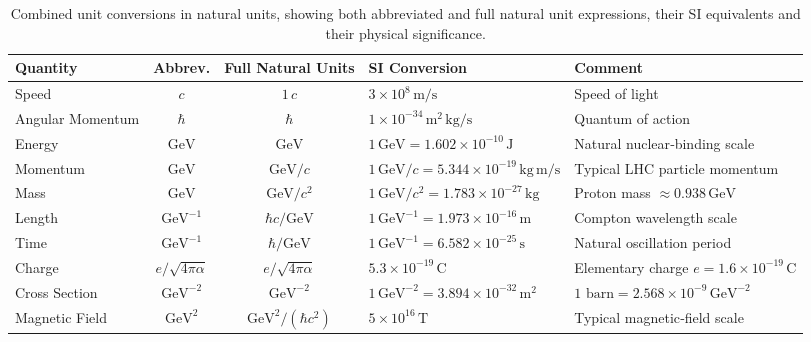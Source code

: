 \begin{table}
    \centering
    \caption[Unit conversions in natural units]{%
      Combined unit conversions in natural units, showing both abbreviated and full natural unit expressions, their SI equivalents and their physical significance.
    }
    \label{tab:unit-conversions-combined}
    \begin{tabular}{@{} l c c l p{5cm} @{}}
      \toprule
      Quantity           & Abbrev.               & Full Natural Units                & SI Conversion                                                    & Comment                                           \\
      \midrule
      Speed              & \(c\)                 & \(1\,c\)                          & \(3\times10^{8}\,\mathrm{m/s}\)                                   & Speed of light                                    \\
      Angular Momentum   & \(\hbar\)             & \(\hbar\)                         & \(1\times10^{-34}\,\mathrm{m^{2}\,kg/s}\)                         & Quantum of action                                 \\
      Energy             & \(\mathrm{GeV}\)      & \(\mathrm{GeV}\)                  & \(1\,\mathrm{GeV}=1.602\times10^{-10}\,\mathrm{J}\)               & Natural nuclear‐binding scale                     \\
      Momentum           & \(\mathrm{GeV}\)      & \(\mathrm{GeV}/c\)                & \(1\,\mathrm{GeV}/c=5.344\times10^{-19}\,\mathrm{kg\,m/s}\)       & Typical LHC particle momentum                     \\
      Mass               & \(\mathrm{GeV}\)      & \(\mathrm{GeV}/c^{2}\)            & \(1\,\mathrm{GeV}/c^{2}=1.783\times10^{-27}\,\mathrm{kg}\)        & Proton mass \(\approx0.938\,\mathrm{GeV}\)        \\
      Length             & \(\mathrm{GeV}^{-1}\) & \(\hbar c/\mathrm{GeV}\)          & \(1\,\mathrm{GeV}^{-1}=1.973\times10^{-16}\,\mathrm{m}\)           & Compton wavelength scale                          \\
      Time               & \(\mathrm{GeV}^{-1}\) & \(\hbar/\mathrm{GeV}\)            & \(1\,\mathrm{GeV}^{-1}=6.582\times10^{-25}\,\mathrm{s}\)           & Natural oscillation period                       \\
      Charge             & \(e/\sqrt{4\pi\alpha}\)& \(e/\sqrt{4\pi\alpha}\)          & \(5.3\times10^{-19}\,\mathrm{C}\)                                 & Elementary charge \(e=1.6\times10^{-19}\,\mathrm{C}\) \\
      Cross Section      & \(\mathrm{GeV}^{-2}\) & \(\mathrm{GeV}^{-2}\)             & \(1\,\mathrm{GeV}^{-2}=3.894\times10^{-32}\,\mathrm{m^{2}}\)      & \(1\text{ barn}=2.568\times10^{-9}\,\mathrm{GeV}^{-2}\) \\
      Magnetic Field     & \(\mathrm{GeV}^{2}\)  & \(\mathrm{GeV}^{2}/(\hbar c^{2})\)& \(5\times10^{16}\,\mathrm{T}\)                                    & Typical magnetic‐field scale                      \\
      \bottomrule
    \end{tabular}
  \end{table}